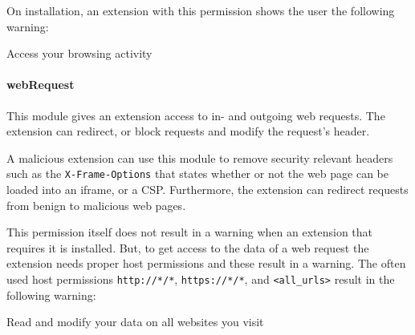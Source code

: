 	On installation, an extension with this permission shows the user the following warning:
	\begin{permissionwarning}
		Access your browsing activity 
	\end{permissionwarning}		
	
\paragraph{webRequest}
	This module gives an extension access to in- and outgoing web requests. The extension can redirect, or block requests and modify the request's header.
	
	A malicious extension can use this module to remove security relevant headers such as the \texttt{X-Frame-Options} that states whether or not the web page can be loaded into an iframe, or a CSP. Furthermore, the extension can redirect requests from benign to malicious web pages.
	
	This permission itself does not result in a warning when an extension that requires it is installed. But, to get access to the data of a web request the extension needs proper host permissions and these result in a warning. The often used host permissions \texttt{http://*/*}, \texttt{https://*/*}, and \texttt{<all\_urls>} result in the following warning:
	\begin{permissionwarning}
		Read and modify your data on all websites you visit 
	\end{permissionwarning}
	
	
	
	
	
